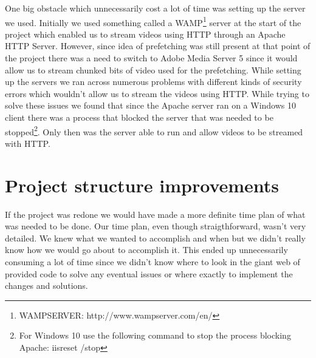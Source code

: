 One big obstacle which unnecessarily cost a lot of time was setting up the server we used. Initially we used something called a WAMP\footnote{WAMPSERVER: http://www.wampserver.com/en/} server at the start of the project which enabled us to stream videos using HTTP through an Apache HTTP Server. However, since idea of prefetching was still present at that point of the project there was a need to switch to Adobe Media Server 5 since it would allow us to stream chunked bits of video used for the prefetching. While setting up the servers we ran across numerous problems with different kinds of security errors which wouldn’t allow us to stream the videos using HTTP. While trying to solve these issues we found that since the Apache server ran on a Windows 10 client there was a process that blocked the server that was needed to be stopped\footnote{For Windows 10 use the following command to stop the process blocking Apache: iisreset /stop}. Only then was the server able to run and allow videos to be streamed with HTTP.

\section{Project structure improvements}
\label{sec:psi}

If the project was redone we would have made a more definite time plan of what was needed to be done. Our time plan, even though straigthforward, wasn’t very detailed. We knew what we wanted to accomplish and when but we didn’t really know how we would go about to accomplish it. This ended up unnecessarily consuming a lot of time since we didn’t know where to look in the giant web of provided code to solve any eventual issues or where exactly to implement the changes and solutions.